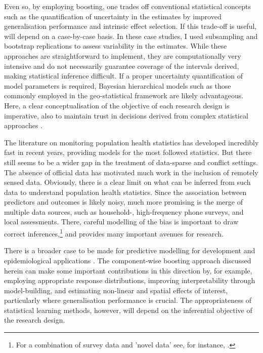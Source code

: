 Even so, by employing boosting, one trades off conventional statistical concepts such as the quantification of uncertainty in the estimates by improved generalisation performance and intrinsic effect selection. If this trade-off is useful, will depend on a case-by-case basis. In these case studies, I used subsampling and bootstrap replications to assess variability in the estimates. While these approaches are straightforward to implement, they are computationally very intensive and do not necessarily guarantee coverage of the intervals derived, making statistical inference difficult. If a proper uncertainty quantification of model parameters is required, Bayesian hierarchical models such as those commonly employed in the geo-statistical framework are likely advantageous. Here, a clear conceptualisation of the objective of each research design is imperative, also to maintain trust in decisions derived from complex statistical approaches \textcite{broderickTaxonomyTrustProbabilistic2021}.

The literature on monitoring population health statistics has developed incredibly fast in recent years, providing models for the most followed statistics. But there still seems to be a wider gap in the treatment of data-sparse and conflict settings. The absence of official data has motivated much work in the inclusion of remotely sensed data. Obviously, there is a clear limit on what can be inferred from such data to understand population health statistics. Since the association between predictors and outcomes is likely noisy, much more promising is the merge of multiple data sources, such as household-, high-frequency phone surveys, and local assessments. There, careful modelling of the bias is important to draw correct inferences,\footnote{For a combination of survey data and 'novel data' see, for instance, \textcite{alexanderCombiningSocialMedia2022, hsiaoModelingBiasDigital2023}.} and provides many important avenues for research.

There is a broader case to be made for predictive modelling for development and epidemiological applications \autocite[e.g.,][]{greenoughMappingCaseGeospatial2019}. The component-wise boosting approach discussed herein can make some important contributions in this direction by, for example, employing appropriate response distributions, improving interpretability through model-building, and estimating non-linear and spatial effects of interest, particularly where generalisation performance is crucial. The appropriateness of statistical learning methods, however, will depend on the inferential objective of the research design.



